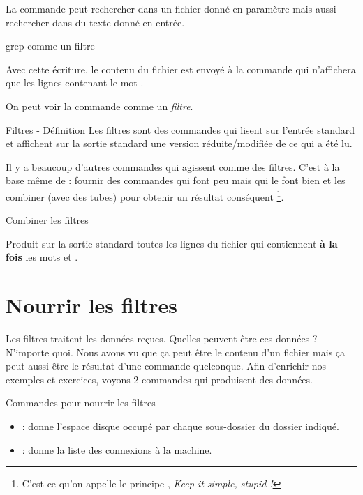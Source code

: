 \documentclass[a4paper,11pt]{style-esi/td}
\begin{document}
		La commande 
		peut rechercher dans un fichier donné en paramètre
		mais aussi rechercher dans du texte donné en entrée.

		\begin{Exemple}{grep comme un filtre}
			
			\medskip
			Avec cette écriture, le contenu du fichier 
			est envoyé à la commande  qui n'affichera
			que les lignes contenant le mot .
		\end{Exemple}

		On peut voir la commande comme un \emph{filtre}.

		\begin{theorie}{Filtres - Définition}
			Les filtres sont des commandes qui lisent sur l'entrée standard
			et affichent sur la sortie standard 
			une version réduite/modifiée de ce qui a été lu.
		\end{theorie}
	
		Il y a beaucoup d'autres commandes qui agissent comme des filtres.
		C'est à la base même de  : fournir des commandes qui font peu 
		mais qui le font bien et les combiner (avec des tubes)
		pour obtenir un résultat conséquent%
		\footnote{%
			C'est ce qu'on appelle le principe , 
			\emph{Keep it simple, stupid !}
		}.

\newpage

		\begin{Exemple}{Combiner les filtres}
			
			\medskip
			Produit sur la sortie standard toutes les lignes du fichier
			 qui contiennent \textbf{à la fois}
			les mots  et .
		\end{Exemple}

	\section{Nourrir les filtres}
	
		Les filtres traitent les données reçues.
		Quelles peuvent être ces données ? N'importe quoi.
		Nous avons vu que ça peut être le contenu d'un fichier
		mais ça peut aussi être le résultat d'une commande quelconque.
		Afin d'enrichir nos exemples et exercices, 
		voyons 2 commandes qui produisent des données.

		\begin{theorie}{Commandes pour nourrir les filtres}
			\begin{itemize}
			\item 
				 : 
				donne l'espace disque occupé par chaque sous-dossier
				du dossier indiqué.
			\item 
				 : 
				donne la liste des connexions à la machine.
			\end{itemize}
		\end{theorie}
\end{document}
